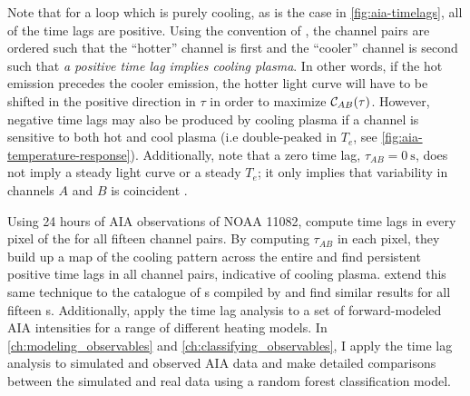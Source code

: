 Note that for a loop which is purely cooling, as is the case in \autoref{fig:aia-timelags}, all of the time lags are positive. Using the convention of \citet{viall_evidence_2012}, the channel pairs are ordered such that the ``hotter'' channel is first and the ``cooler'' channel is second such that \textit{a positive time lag implies cooling plasma}. In other words, if the hot emission precedes the cooler emission, the hotter light curve will have to be shifted in the positive direction in $\tau$ in order to maximize $\mathcal{C}_{AB}(\tau)$. However, negative time lags may also be produced by cooling plasma if a channel is sensitive to both hot and cool plasma (i.e double-peaked in $T_e$, see \autoref{fig:aia-temperature-response}). Additionally, note that a zero time lag, $\tau_{AB}=\SI{0}{\second}$, does not imply a steady light curve or a steady $T_e$; it only implies that variability in channels $A$ and $B$ is coincident \citep{viall_transition_2015,viall_signatures_2016}.

Using 24 hours of AIA observations of \AR{} NOAA 11082, \citet{viall_evidence_2012} compute time lags in every pixel of the \AR{} for all fifteen channel pairs. By computing $\tau_{AB}$ in each pixel, they build up a map of the cooling pattern across the entire \AR{} and find persistent positive time lags in all channel pairs, indicative of cooling plasma. \citet{viall_survey_2017} extend this same technique to the catalogue of \AR s compiled by \citet{warren_systematic_2012} and find similar results for all fifteen \AR s. Additionally, \citet{bradshaw_patterns_2016} apply the time lag analysis to a set of forward-modeled AIA intensities for a range of different heating models. In \autoref{ch:modeling_observables} and \autoref{ch:classifying_observables}, I apply the time lag analysis to simulated and observed AIA data and make detailed comparisons between the simulated and real data using a random forest classification model.



